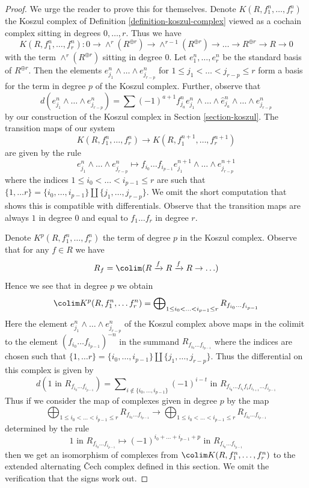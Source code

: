 \begin{proof}
We urge the reader to prove this for themselves.
Denote $K(R, f_1^n, \ldots, f_r^n)$ the Koszul complex of
Definition \ref{definition-koszul-complex} viewed as a cochain complex
sitting in degrees $0, \ldots, r$. Thus we have
$$
K(R, f_1^n, \ldots, f_r^n) :
0 \to \wedge^r(R^{\oplus r}) \to
\wedge^{r - 1}(R^{\oplus r}) \to \ldots \to
R^{\oplus r} \to R \to 0
$$
with the term $\wedge^r(R^{\oplus r})$ sitting in degree $0$.
Let $e^n_1, \ldots, e^n_r$ be the standard basis of $R^{\oplus r}$.
Then the elements $e^n_{j_1} \wedge \ldots \wedge e^n_{j_{r - p}}$ for
$1 \leq j_1 < \ldots < j_{r - p} \leq r$ form a basis for the term in
degree $p$ of the Koszul complex. Further, observe that
$$
d(e^n_{j_1} \wedge \ldots \wedge e^n_{j_{r - p}}) =
\sum (-1)^{a + 1} f_{j_a}^n e^n_{j_1} \wedge \ldots \wedge \hat e^n_{j_a} \wedge
\ldots \wedge e^n_{j_{r - p}}
$$
by our construction of the Koszul complex in Section \ref{section-koszul}.
The transition maps of our system
$$
K(R, f_1^n, \ldots, f_r^n) \to K(R, f_1^{n + 1}, \ldots, f_r^{n + 1})
$$
are given by the rule
$$
e^n_{j_1} \wedge \ldots \wedge e^n_{j_{r - p}}
\longmapsto
f_{i_0} \ldots f_{i_{p - 1}}
e^{n + 1}_{j_1} \wedge \ldots \wedge e^{n + 1}_{j_{r - p}}
$$
where the indices $1 \leq i_0 < \ldots < i_{p - 1} \leq r$ are such that
$\{1, \ldots r\} =
\{i_0, \ldots, i_{p - 1}\} \amalg \{j_1, \ldots, j_{r - p}\}$.
We omit the short computation that shows this is compatible with differentials.
Observe that the transition maps are always $1$ in degree $0$
and equal to $f_1 \ldots f_r$ in degree $r$.

\medskip\noindent
Denote $K^p(R, f_1^n, \ldots, f_r^n)$ the term of degree $p$ in the Koszul
complex. Observe that for any $f \in R$ we have
$$
R_f = \colim (R \xrightarrow{f} R \xrightarrow{f} R \to \ldots )
$$
Hence we see that in degree $p$ we obtain
$$
\colim K^p(R, f_1^n, \ldots f_r^n) =
\bigoplus\nolimits_{1 \leq i_0 < \ldots < i_{p - 1} \leq r}
R_{f_{i_0} \ldots f_{i_{p - 1}}}
$$
Here the element $e^n_{j_1} \wedge \ldots \wedge e^n_{j_{r - p}}$
of the Koszul complex above maps in the colimit
to the element $(f_{i_0} \ldots f_{i_{p - 1}})^{-n}$ in the
summand $R_{f_{i_0} \ldots f_{i_{p - 1}}}$
where the indices are chosen such that
$\{1, \ldots r\} = \{i_0, \ldots, i_{p - 1}\}
\amalg \{j_1, \ldots, j_{r - p}\}$.
Thus the differential on this complex is given by
$$
d(1\text{ in }R_{f_{i_0} \ldots f_{i_{p - 1}}}) =
\sum\nolimits_{i \not \in \{i_0, \ldots, i_{p - 1}\}}
(-1)^{i - t}\text{ in }
R_{f_{i_0} \ldots f_{i_t} f_i f_{i_{t + 1}} \ldots f_{i_{p - 1}}}
$$
Thus if we consider the map of complexes given in degree $p$
by the map
$$
\bigoplus\nolimits_{1 \leq i_0 < \ldots < i_{p - 1} \leq r}
R_{f_{i_0} \ldots f_{i_{p - 1}}}
\longrightarrow
\bigoplus\nolimits_{1 \leq i_0 < \ldots < i_{p - 1} \leq r}
R_{f_{i_0} \ldots f_{i_{p - 1}}}
$$
determined by the rule
$$
1\text{ in }R_{f_{i_0} \ldots f_{i_{p - 1}}}
\longmapsto
(-1)^{i_0 + \ldots + i_{p - 1} + p}\text{ in }R_{f_{i_0} \ldots f_{i_{p - 1}}}
$$
then we get an isomorphism of complexes from
$\colim K(R, f_1^n, \ldots, f_r^n)$ to the
extended alternating {\v C}ech complex defined in this section.
We omit the verification that the signs work out.
\end{proof}
